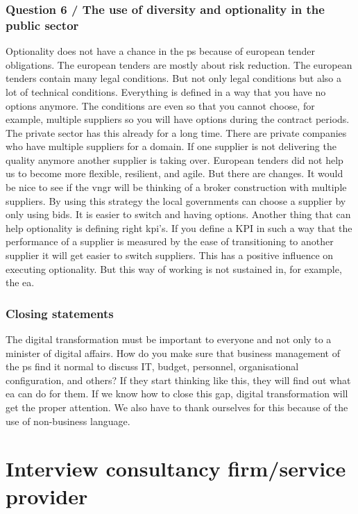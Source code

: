 \subsubsection{Question 6 / The use of diversity and optionality in the public sector}
Optionality does not have a chance in the \gls{ps} because of european tender obligations. The european tenders are mostly about risk reduction. The european tenders contain many legal conditions. But not only legal conditions but also a lot of technical conditions. Everything is defined in a way that you have no options anymore. The conditions are even so that you cannot choose, for example, multiple suppliers so you will have options during the contract periods. The private sector has this already for a long time. There are private companies who have multiple suppliers for a domain. If one supplier is not delivering the quality anymore another supplier is taking over. European tenders did not help us to become more flexible, resilient, and agile. But there are changes. It would be nice to see if the \acrfull{vngr} will be thinking of a broker construction with multiple suppliers. By using this strategy the local governments can choose a supplier by only using bids. It is easier to switch and having options. Another thing that can help optionality is defining right \acrfull{kpi}'s. If you define a KPI in such a way that the performance of a supplier is measured by the ease of transitioning to another supplier it will get easier to switch suppliers. This has a positive influence on executing optionality. But this way of working is not sustained in, for example, the \acrshort{ea}.
\subsubsection{Closing statements}
The digital transformation must be important to everyone and not only to a minister of digital affairs. How do you make sure that business management of the \gls{ps} find it normal to discuss IT, budget, personnel, organisational configuration, and others? If they start thinking like this, they will find out what \acrshort{ea} can do for them. If we know how to close this gap, digital transformation will get the proper attention. We also have to thank ourselves for this because of the use of non-business language.
\section{Interview consultancy firm/service provider}
\label{sec:interviewconsultancyfirm}

